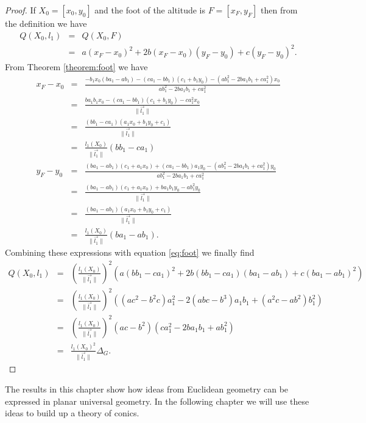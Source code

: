 \begin{proof}
If $X_0 = [x_0, y_0]$ and the foot of the altitude is $F = [x_F, y_F]$ then from the definition we have
\begin{eqnarray}
Q(X_0, l_1) & = & Q(X_0, F)\nonumber\\
        & = & a(x_F - x_0)^2 + 2b(x_F - x_0)(y_F - y_0) + c(y_F - y_0)^2.\label{eq:foot}
\end{eqnarray}
From Theorem \ref{theorem:foot} we have
\begin{eqnarray}
x_F - x_0 & = & \frac{-b_1x_0(ba_1 - ab_1) - (ca_1 - bb_1)(c_1 + b_1y_0) - (ab_1^2 - 2ba_1b_1 + ca_1^2)x_0}{ab_1^2 - 2ba_1b_1 + ca_1^2}\nonumber\\
          & = & \frac{ba_1b_1x_0 - (ca_1 - bb_1)(c_1 + b_1y_0) - ca_1^2x_0}{\|\vec{l_1}\|}\nonumber\\
          & = & \frac{(bb_1 - ca_1)(a_1x_0 + b_1y_0 + c_1)}{\|\vec{l_1}\|}\nonumber\\
          & = & \frac{l_1(X_0)}{\|\vec{l_1}\|}(bb_1 - ca_1)\nonumber\\
y_F - y_0 & = & \frac{(ba_1 - ab_1)(c_1 + a_1x_0) + (ca_1 - bb_1)a_1y_0 - (ab_1^2 - 2ba_1b_1 + ca_1^2)y_0 }{ab_1^2 - 2ba_1b_1 + ca_1^2}\nonumber\\
          & = & \frac{(ba_1 - ab_1)(c_1 + a_1x_0) + ba_1b_1y_0 - ab_1^2y_0 }{\|\vec{l_1}\|}\nonumber\\
          & = & \frac{(ba_1 - ab_1)(a_1x_0 + b_1y_0 + c_1)}{\|\vec{l_1}\|}\nonumber\\
          & = & \frac{l_1(X_0)}{\|\vec{l_1}\|}(ba_1 - ab_1).\nonumber
\end{eqnarray}
Combining these expressions with equation \ref{eq:foot} we finally find
\begin{eqnarray}
Q(X_0, l_1) & = & \left(\frac{l_1(X_0)}{\|\vec{l_1}\|}\right)^2\left( a(bb_1 - ca_1)^2 + 2b(bb_1 - ca_1)(ba_1 - ab_1) + c(ba_1 - ab_1)^2 \right)\nonumber\\
        & = & \left(\frac{l_1(X_0)}{\|\vec{l_1}\|}\right)^2\left( (ac^2 - b^2c)a_1^2 - 2(abc - b^3)a_1b_1 + (a^2c - ab^2)b_1^2 \right)\nonumber\\
        & = & \left(\frac{l_1(X_0)}{\|\vec{l_1}\|}\right)^2(ac - b^2)( ca_1^2 - 2ba_1b_1 + ab_1^2)\nonumber\\
        & = & \frac{l_1(X_0)^2}{\|\vec{l_1}\|}\Delta_G.
\end{eqnarray}
\end{proof}

The results in this chapter show how ideas from Euclidean geometry can be expressed in planar universal geometry.
In the following chapter we will use these ideas to build up a theory of conics.
